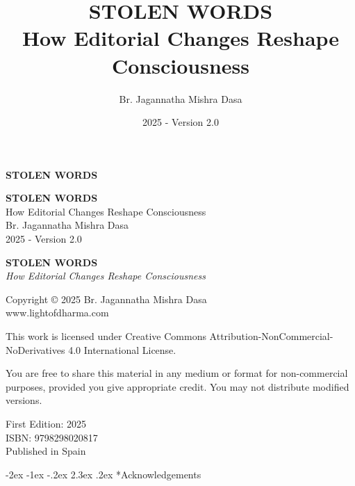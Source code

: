 \documentclass[12pt,twoside]{book}
\author{Br. Jagannatha Mishra Dasa}
\date{2025 - Version 2.0}
\title{STOLEN WORDS\\\medskip
\large How Editorial Changes Reshape Consciousness}
\makeatletter
\renewcommand\section{\@startsection{section}{1}{\z@}%
{-2ex \@plus -1ex \@minus -.2ex}%
{2.3ex \@plus.2ex}%
{\normalfont\Large\bfseries}}
\makeatother
\begin{document}
\thispagestyle{frontmatter}
\vspace*{0.20\textheight}
\begin{center}
{\fontsize{48}{58}\selectfont\textbf{STOLEN WORDS}}
\end{center}
\vspace*{\fill}
\clearpage

\thispagestyle{frontmatter}
\mbox{}
\newpage

\thispagestyle{frontmatter}
\vspace*{0.33\textheight}
\begin{center}
{\fontsize{36}{42}\selectfont\textbf{STOLEN WORDS}}\\[0.4cm]
{\large How Editorial Changes Reshape Consciousness}\\[1.5cm]
\vspace{0.12\textheight}
{\Large Br. Jagannatha Mishra Dasa}\\[2cm]
\vspace*{\fill}
{\normalsize 2025 - Version 2.0}
\end{center}
\clearpage

\thispagestyle{frontmatter}
\textbf{STOLEN WORDS}\\
\emph{How Editorial Changes Reshape Consciousness}

Copyright © 2025 Br. Jagannatha Mishra Dasa\\
www.lightofdharma.com

This work is licensed under Creative Commons Attribution-NonCommercial-NoDerivatives 4.0 International License.

You are free to share this material in any medium or format for non-commercial purposes, provided you give appropriate credit. You may not distribute modified versions.

\vspace*{\fill}

First Edition: 2025\\
ISBN: 9798298020817\\
Published in Spain

\clearpage

\thispagestyle{empty}
{\let\clearpage\relax\tableofcontents}

\clearpage

\section*{Acknowledgements}
\thispagestyle{frontmatter}
\end{document}
